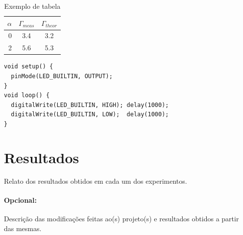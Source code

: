 \documentclass{article}
\begin{document}
\begin{table}[htb]
\caption{Exemplo de tabela}
\centering
\label{tab:exemplo}
    \begin{tabular}{rcc}
        \hline \hline
        $\alpha$ & $\Gamma_{meas}$ & $\Gamma_{theor}$ \\
        \hline
        0 & 3.4 & 3.2 \\
        2 & 5.6 & 5.3 \\
        \hline
    \end{tabular}
\end{table}

\lstset{numbers=left, numberstyle=\tiny, language=C}
\begin{lstlisting}[caption={Exemplo de algoritmo}, label={lst:exemplo}, firstnumber=1, frame=single]
void setup() {
  pinMode(LED_BUILTIN, OUTPUT);
}
void loop() {
  digitalWrite(LED_BUILTIN, HIGH); delay(1000);
  digitalWrite(LED_BUILTIN, LOW);  delay(1000);
}
\end{lstlisting}

\section{Resultados}

Relato dos resultados obtidos em cada um dos experimentos.

\paragraph{Opcional:} Descrição das modificações feitas ao(s) projeto(s) e resultados
obtidos a partir das mesmas.
 
\end{document}
